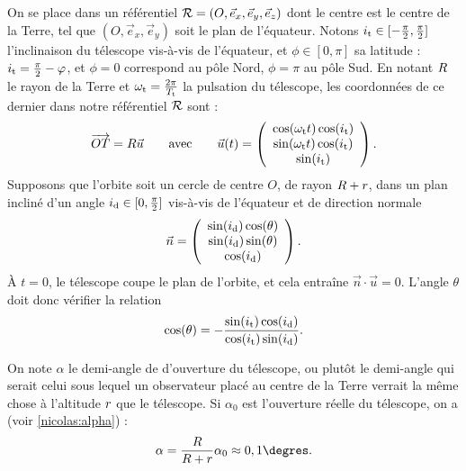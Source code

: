 On se place dans un référentiel $\mathcal{R} = (O,\vec{e}_x,\vec{e}_y,\vec{e}_z)$ dont le centre est le centre de la Terre, tel que $(O,\vec{e}_x,\vec{e}_y)$ soit le plan de l'équateur. Notons $i_\text{t} \in [-\frac{\pi}{2}, \frac{\pi}{2}]$ l'inclinaison du télescope vis-à-vis de l'équateur, et $\phi \in [0,\pi]$ sa latitude : $i_\text{t} = \frac{\pi}{2} - \varphi$, et $\phi=0$ correspond au pôle Nord, $\phi = \pi$ au pôle Sud. En notant  $R$ le rayon de la Terre et $\omega_\text{t} = \frac{2\pi}{T_\text{t}}$ la pulsation du télescope, les coordonnées de ce dernier dans notre référentiel $\mathcal{R}$  sont :
\[ 
\overrightarrow{OT} = R \vec{u} \qquad \text{avec} \qquad \vec{u}(t) = \left(\begin{array}{c}
\cos(\omega_\text{t} t) \cos(i_\text{t}) \\
\sin(\omega_\text{t} t) \cos(i_\text{t}) \\
\sin(i_\text{t})
\end{array}
\right).
\]
Supposons que l'orbite soit un cercle de centre $O$, de rayon $R+r$, dans un plan incliné d'un angle $i_\text{d} \in [0, \frac{\pi}{2}]$ vis-à-vis de l'équateur et de direction normale
\[ 
\vec{n} =  \left(\begin{array}{c}
 \sin(i_\text{d})\cos(\theta) \\
\sin(i_\text{d})\sin(\theta) \\
 \cos(i_\text{d}) 
\end{array}
\right).
\]
À $t=0$, le télescope coupe le plan de l'orbite, et cela entraîne $\vec{n}\cdot \vec{u} = 0$. L'angle $\theta$ doit donc vérifier la relation
\[ \cos(\theta) = - \frac{\sin(i_\text{t})\cos(i_\text{d})}{\cos(i_\text{t})\sin(i_\text{d})}.\]

On note $\alpha$ le demi-angle de d'ouverture du télescope, ou plutôt le demi-angle qui serait celui sous lequel un observateur placé au centre de la Terre verrait la même chose à l'altitude $r$ que le télescope. Si $\alpha_0$ est l'ouverture réelle du télescope, on a (voir \autoref{nicolas:alpha}) :
\[ \alpha = \frac{\rayonT}{\rayonD} \alpha_0 \approx 0,1\text{\degres}.\]

